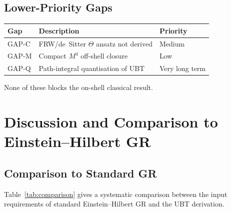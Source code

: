\documentclass[12pt,a4paper]{article}
\theoremstyle{definition}
\theoremstyle{remark}
\begin{document}
\subsection{Lower-Priority Gaps}

\begin{center}
\begin{tabular}{lll}
\toprule
\textbf{Gap} & \textbf{Description} & \textbf{Priority} \\
\midrule
GAP-C & FRW/de~Sitter $\Theta$ ansatz not derived & Medium \\
GAP-M & Compact $M^4$ off-shell closure & Low \\
GAP-Q & Path-integral quantisation of UBT & Very long term \\
\bottomrule
\end{tabular}
\end{center}

None of these blocks the on-shell classical result.

\section{Discussion and Comparison to Einstein--Hilbert GR}
\label{sec:discussion}

\subsection{Comparison to Standard GR}

Table~\ref{tab:comparison} gives a systematic comparison between the input
requirements of standard Einstein--Hilbert GR and the UBT derivation.
\end{document}
